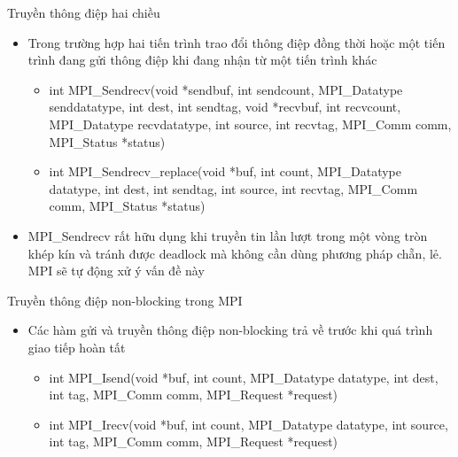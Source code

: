 \documentclass[10pt]{beamer}
\theoremstyle{remark}
\numberwithin{algocf}{section}
\numberwithin{equation}{section}
\numberwithin{dl}{section}
\numberwithin{figure}{section}
\begin{document}
\begin{frame}{Truyền thông điệp hai chiều}
    \begin{itemize}
        \item Trong trường hợp hai tiến trình trao đổi thông điệp đồng thời hoặc một tiến trình đang gửi thông điệp khi đang nhận từ một tiến trình khác
        \begin{itemize}
            \item int MPI\_Sendrecv(void *sendbuf, int sendcount,
                                    MPI\_Datatype senddatatype, int dest, int sendtag,
                                    void *recvbuf, int recvcount, MPI\_Datatype recvdatatype,
                                    int source, int recvtag, MPI\_Comm comm,
                                    MPI\_Status *status)
            \item int MPI\_Sendrecv\_replace(void *buf, int count,
                                             MPI\_Datatype datatype, int dest, int sendtag,
                                             int source, int recvtag, MPI\_Comm comm,
                                             MPI\_Status *status)
        \end{itemize}
        \item MPI\_Sendrecv rất hữu dụng khi truyền tin lần lượt trong một vòng tròn khép kín và tránh được deadlock mà không cần dùng phương pháp chẵn, lẻ.
        MPI sẽ tự động xử ý vấn đề này
    \end{itemize}
\end{frame}

\begin{frame}{Truyền thông điệp non-blocking trong MPI}
    \begin{itemize}
        \item Các hàm gửi và truyền thông điệp non-blocking trả về trước khi quá trình giao tiếp hoàn tất 
        \begin{itemize}
            \item int MPI\_Isend(void *buf, int count, MPI\_Datatype datatype,
                                int dest, int tag, MPI\_Comm comm,
                                MPI\_Request *request) 
            \item int MPI\_Irecv(void *buf, int count, MPI\_Datatype datatype,
                                   int source, int tag, MPI\_Comm comm,
                                   MPI\_Request *request)
        \end{itemize}
    \end{itemize}
\end{frame}
\end{document}
